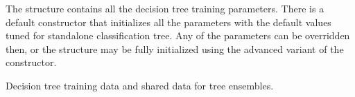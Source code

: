 %

The structure contains all the decision tree training parameters. There is a default constructor that initializes all the parameters with the default values tuned for standalone classification tree. Any of the parameters can be overridden then, or the structure may be fully initialized using the advanced variant of the constructor.


Decision tree training data and shared data for tree ensembles.

